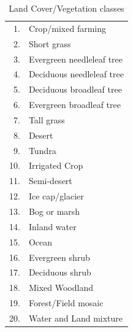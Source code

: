 \begin{table}
\centering
\caption{Land Cover/Vegetation classes}
\label{VegTypes}
\begin{tabular}{rl}
\hline
\hline
1.&Crop/mixed farming\\
2.&Short grass\\
3.&Evergreen needleleaf tree\\
4.&Deciduous needleleaf tree\\
5.&Deciduous broadleaf tree\\
6.&Evergreen broadleaf tree\\
7.&Tall grass\\
8.&Desert\\
9.&Tundra\\
10.&Irrigated Crop\\
11.&Semi-desert\\
12.&Ice cap/glacier\\
13.&Bog or marsh\\
14.&Inland water\\
15.&Ocean\\
16.&Evergreen shrub\\
17.&Deciduous shrub\\
18.&Mixed Woodland\\
19.&Forest/Field mosaic \\
20.&Water and Land mixture \\
\hline
\hline
\end{tabular}
\end{table}

\newpage

